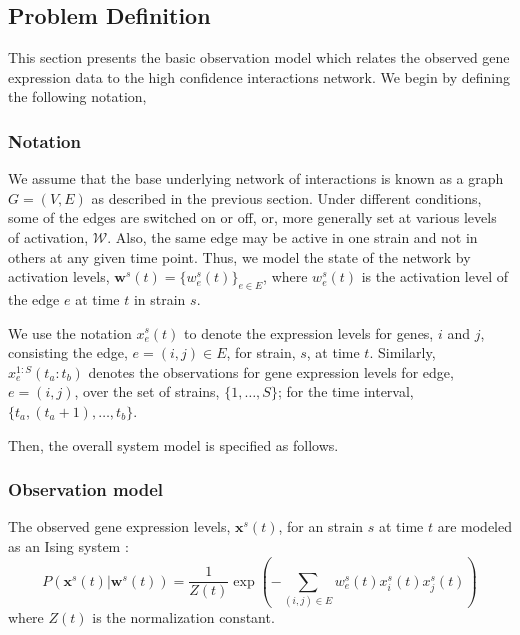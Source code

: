 \documentclass{bioinfo}
\begin{document}
\begin{methods}
\subsection{Problem Definition}

This section presents the basic observation model which relates the
observed gene expression data to the high confidence interactions
network. We begin by defining the following notation, 
\subsubsection{Notation}
We assume that the base underlying network of interactions is known as a
graph $G=(V,E)$ as described in the previous section. Under different conditions, some of the edges are 
switched on or off, or, more generally set at various levels of
activation, $\mathcal W$. Also, the same edge may be active in one
strain and not in others at any given time point. Thus, we model the
state of the network by activation levels, $\mathbf{w}^{s}(t) = \{w^s_{e}(t)\}_{e
\in E}$, where $w^s_{e}(t)$ is the activation level of the edge $e$ at time $t$ in strain $s$. 

We use the notation $x^{s}_{e}(t)$ to denote the expression
levels for genes, $i$ and $j$, consisting the edge, $e=(i,j)\in E$,
for strain, $s$, at time $t$. Similarly,  $x_{e}^{1:S}(t_{a}:t_{b})$
denotes the observations for gene expression levels for edge,
$e=(i,j)$, over the set of strains, $\{1,\ldots, S\}$; for the time
interval, $\{t_{a}, (t_{a}+1), \ldots, t_{b}\}$. 

Then, the overall system model is specified as follows.

\subsubsection{Observation model}
\label{observation-model}

The observed gene expression levels, $\mathbf{x}^{s}(t)$, for an strain
$s$ at time $t$ are modeled as an Ising system \citep{Song09KELLER}:
\begin{equation}
\label{eq:ising}
 P\left(\mathbf{x}^{s}(t) | \mathbf{w}^{s}(t)\right) = 
      \frac{1}{Z(t)} \exp \left( - \sum_{(i,j) \in E} w^s_{e}(t)
        x^{s}_i(t) x^{s}_j(t)\right)  
\end{equation}
where $Z(t)$ is the normalization constant. 


\end{methods}
\end{document}
